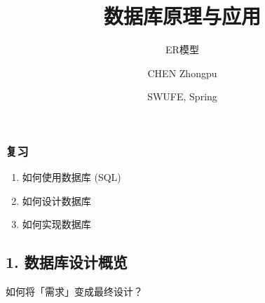\documentclass[aspectratio=169, 14pt]{beamer}
\title[Database Principles and Applications] %
{数据库原理与应用}
\subtitle{ER模型}
\author[CHEN Zhongpu] %
{CHEN Zhongpu}
\institute[] %
{
  School of Computing and Artificial Intelligence \\
  \href{mailto:zpchen@swufe.edu.cn}{zpchen@swufe.edu.cn}
}
\date[] %
{SWUFE, Spring \the\year{}}
\begin{document}
\frame{\titlepage}

\begin{frame}
    \frametitle{复习}
    \begin{center}
        \LARGE {}
    \end{center}
    \begin{enumerate}
        \item 如何使用数据库 (SQL)
        \item \alert{如何设计数据库}
        \item 如何实现数据库
    \end{enumerate}

\end{frame}

{
    \begin{frame}
        \section{\textcolor{darkmidnightblue}{1. 数据库设计概览}}
        如何将「需求」变成最终设计？
    \end{frame}
}
\end{document}
